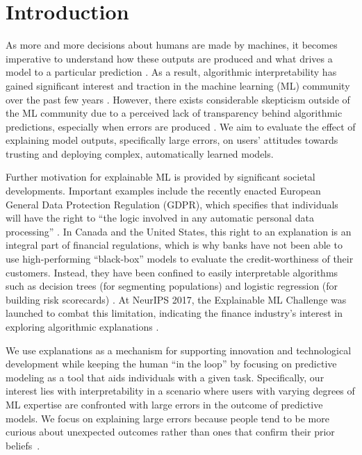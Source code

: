

\section{Introduction}
\label{section:1}
As more and more decisions about humans are made by machines, it becomes imperative to understand how these outputs are produced and what drives a model to a particular prediction \citep{riberio-2016-model}. 
As a result, algorithmic interpretability has gained significant interest and traction in the machine learning (ML) community over the past few years \citep{doshi-2017-towards}.
However, there exists considerable skepticism outside of the ML community due to a perceived lack of transparency behind algorithmic predictions, especially when errors are produced \citep{dietvorst-2015-aa}. 
We aim to evaluate the effect of explaining model outputs, specifically large errors, on users' attitudes towards trusting and deploying complex, automatically learned models. 

Further motivation for explainable ML is provided by significant societal developments. 
Important examples include the recently enacted European General Data Protection Regulation (GDPR), which specifies that individuals will have the right to ``the logic involved in any automatic personal data processing'' \citep{gdpr}. 
In Canada and the United States, this right to an explanation is an integral part of financial regulations, which is why banks have not been able to use high-performing ``black-box'' models to evaluate the credit-worthiness of their customers. 
Instead, they have been confined to easily interpretable algorithms such as decision trees (for segmenting populations) and logistic regression (for building risk scorecards) \citep{khandani-2010-consumer}. 
At NeurIPS 2017, the Explainable ML Challenge was launched to combat this limitation, indicating the finance industry's interest in exploring algorithmic explanations \citep{fico_2017}. 

We use explanations as a mechanism for supporting innovation and technological development while keeping the human ``in the loop'' by focusing on predictive modeling as a tool that aids individuals with a given task. 
Specifically, our interest lies with interpretability in a scenario where users with varying degrees of ML expertise are confronted with large errors in the outcome of predictive models. 
We focus on explaining large errors because people tend to be more curious about unexpected outcomes rather than ones that confirm their prior beliefs~\citep{hilton-1986-knowledge}. 

